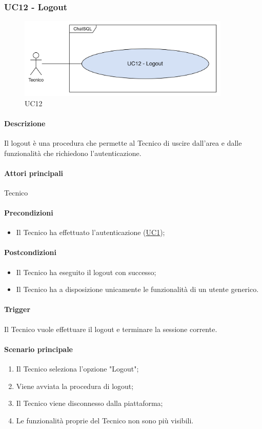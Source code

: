 \subsubsection{UC12 - Logout}\label{UC12}

\begin{figure}[H]
  \centering
  \includegraphics[width=0.90\textwidth]{assets/uc12.png}
  \caption{UC12}
\end{figure}

\paragraph*{Descrizione}
Il logout è una procedura che permette al Tecnico di uscire dall'area e dalle funzionalità che richiedono l'autenticazione.


\paragraph*{Attori principali}
Tecnico

\paragraph*{Precondizioni}
\begin{itemize}
  \item Il Tecnico ha effettuato l'autenticazione (\hyperref[UC1]{UC1});
\end{itemize}

\paragraph*{Postcondizioni}
\begin{itemize}
  \item Il Tecnico ha eseguito il logout con successo;
  \item Il Tecnico ha a disposizione unicamente le funzionalità di un utente generico.
\end{itemize}

\paragraph*{Trigger}
Il Tecnico vuole effettuare il logout e terminare la sessione corrente.

\paragraph*{Scenario principale}
\begin{enumerate}
  \item Il Tecnico seleziona l'opzione "Logout";
  \item Viene avviata la procedura di logout;
  \item Il Tecnico viene disconnesso dalla piattaforma;
  \item Le funzionalità proprie del Tecnico non sono più visibili.
\end{enumerate}
